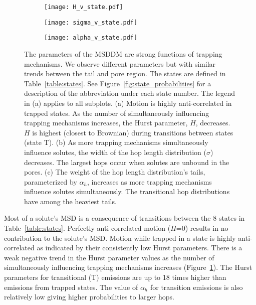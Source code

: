 \documentclass[journal=ancac3,manuscript=article,layout=twocolumn]{achemso}
\begin{document}
  \begin{figure*}
  \centering
  \begin{subfigure}{0.325\textwidth}
  \texttt{[image: H\_v\_state.pdf]}
  \caption{}\label{fig:H_v_state}
  \end{subfigure}
  \begin{subfigure}{0.325\textwidth}
  \texttt{[image: sigma\_v\_state.pdf]}
  \caption{}\label{fig:sigma_v_state}
  \end{subfigure}
  \begin{subfigure}{0.325\textwidth}
  \texttt{[image: alpha\_v\_state.pdf]}
  \caption{}\label{fig:alpha_v_state}
  \end{subfigure}
  \caption{The parameters of the MSDDM are strong functions of trapping
	  mechanisms. We observe different parameters but with similar trends
	  between the tail and pore region. The states are defined in
	  Table~\ref{table:states}. See Figure~\ref{fig:state_probabilities}
	  for a description of the abbreviation under each state number. The
	  legend in (a) applies to all subplots. (a) Motion is highly
	  anti-correlated in trapped states. As the number of simultaneously
	  influencing trapping mechanisms increases, the Hurst parameter, $H$,
	  decreases. $H$ is highest (closest to Brownian) during transitions 
	  between states (state T). (b) As more trapping mechanisms simultaneously influence solutes,
	  the width of the hop length distribution ($\sigma$) decreases. The
	  largest hops occur when solutes are unbound in the pores. (c) The
	  weight of the hop length distribution's tails, parameterized by
	  $\alpha_h$, increases as more trapping mechanisms influence solutes
	  simultaneously. The transitional hop distributions have among the
	  heaviest tails.}\label{fig:msddm_parameters}
  \end{figure*}

  Most of a solute's MSD is a consequence of transitions between the 8 states
  in Table~\ref{table:states}. Perfectly anti-correlated motion ($H$=0) results
  in no contribution to the solute's MSD. Motion while trapped in a state is
  highly anti-correlated as indicated by their consistently low Hurst
  parameters. There is a weak negative trend in the Hurst parameter values as
  the number of simultaneously influencing trapping mechanisms increases
  (Figure~\ref{fig:H_v_state}). The Hurst parameters for transitional (T)
  emissions are up to 18 times higher than emissions from trapped states. The
  value of $\alpha_h$ for transition emissions is also relatively low giving
  higher probabilities to larger hops.
  
\end{document}
